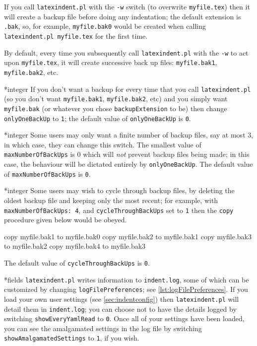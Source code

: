 \documentclass[10pt]{article}
\begin{document}
 If you call \texttt{latexindent.pl} with the \texttt{-w} switch (to overwrite
 \texttt{myfile.tex}) then it will create a backup file before doing any indentation; the
 default extension is \texttt{.bak}, so, for example, \texttt{myfile.bak0} would be
 created when calling \texttt{latexindent.pl myfile.tex} for the first time.

 By default, every time you subsequently call \texttt{latexindent.pl} with the
 \texttt{-w} to act upon \texttt{myfile.tex}, it will create successive back up files:
 \texttt{myfile.bak1}, \texttt{myfile.bak2}, etc.

*{integer}
 \label{page:onlyonebackup}
 If you don't want a backup for every time that you call \texttt{latexindent.pl} (so you
 don't want \texttt{myfile.bak1}, \texttt{myfile.bak2}, etc) and you simply want
 \texttt{myfile.bak} (or whatever you chose \texttt{backupExtension} to be) then change
 \texttt{onlyOneBackUp} to \texttt{1}; the default value of \texttt{onlyOneBackUp} is
 \texttt{0}.

*{integer}
 Some users may only want a finite number of backup files, say at most $3$, in which
 case, they can change this switch. The smallest value of \texttt{maxNumberOfBackUps} is
 $0$ which will \emph{not} prevent backup files being made; in this case, the behaviour
 will be dictated entirely by \texttt{onlyOneBackUp}. The default value of
 \texttt{maxNumberOfBackUps} is \texttt{0}.

*{integer}
 Some users may wish to cycle through backup files, by deleting the oldest backup file and
 keeping only the most recent; for example, with \texttt{maxNumberOfBackUps: 4}, and
 \texttt{cycleThroughBackUps} set to \texttt{1} then the \texttt{copy} procedure given
 below would be obeyed.

 \begin{commandshell}
copy myfile.bak1 to myfile.bak0
copy myfile.bak2 to myfile.bak1
copy myfile.bak3 to myfile.bak2
copy myfile.bak4 to myfile.bak3
\end{commandshell}

 The default value of \texttt{cycleThroughBackUps} is \texttt{0}.

*{fields}
 \texttt{latexindent.pl} writes information to \texttt{indent.log}, some
 of which can be customized by changing \texttt{logFilePreferences}; see
 \cref{lst:logFilePreferences}. If you load your own user settings (see
 \vref{sec:indentconfig}) then \texttt{latexindent.pl} will detail them in
 \texttt{indent.log}; you can choose not to have the details logged by switching
 \texttt{showEveryYamlRead} to \texttt{0}. Once all of your settings have been loaded, you
 can see the amalgamated settings in the log file by switching
 \texttt{showAmalgamatedSettings} to \texttt{1}, if you wish.
\end{document}
